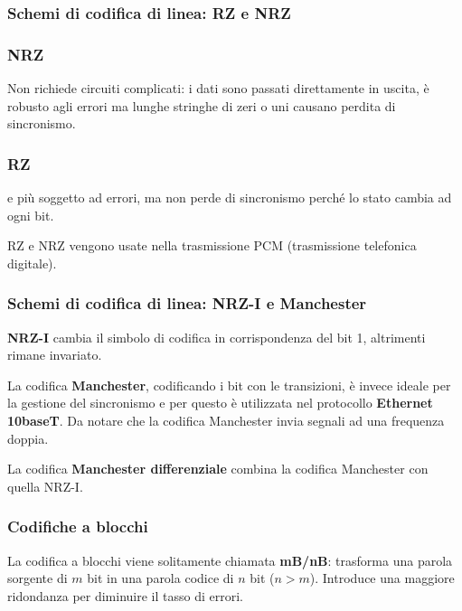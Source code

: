         \subsubsection{Schemi di codifica di linea: RZ e NRZ}
            

            \subsubsection*{NRZ}
            Non richiede circuiti complicati: i dati sono passati direttamente in uscita, è robusto agli errori ma lunghe stringhe di zeri o uni causano perdita di sincronismo.

            \subsubsection*{RZ}
            e più soggetto ad errori, ma non perde di sincronismo perché lo stato cambia ad ogni bit.

            RZ e NRZ vengono usate nella trasmissione PCM (trasmissione telefonica digitale).

        \subsubsection{Schemi di codifica di linea: NRZ-I e Manchester}
            

            \textbf{NRZ-I} cambia il simbolo di codifica in corrispondenza del bit 1, altrimenti rimane invariato.

            La codifica \textbf{Manchester}, codificando i bit con le transizioni, è invece ideale per la gestione del sincronismo e per questo è utilizzata nel protocollo \textbf{Ethernet 10baseT}. Da notare che la codifica Manchester invia segnali ad una frequenza doppia.

            La codifica \textbf{Manchester differenziale} combina la codifica Manchester con quella NRZ-I.

        \subsubsection{Codifiche a blocchi}
            La codifica a blocchi viene solitamente chiamata \textbf{mB/nB}: trasforma una parola sorgente di $m$ bit in una parola codice di $n$ bit ($n > m$). Introduce una maggiore ridondanza per diminuire il tasso di errori.
        
